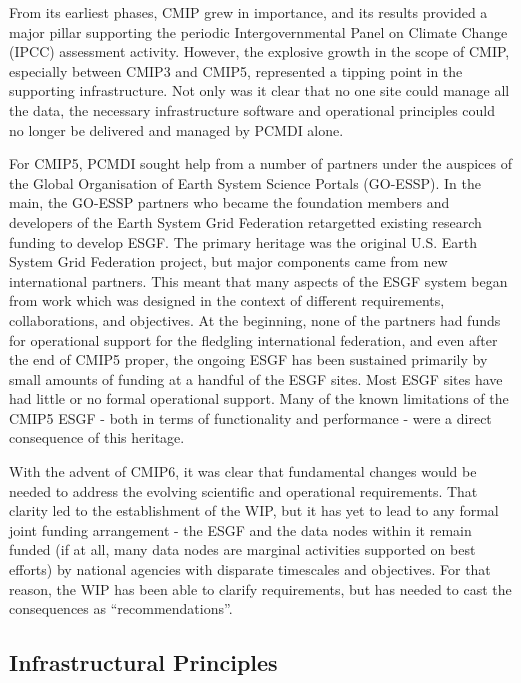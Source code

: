 \documentclass[gmd,manuscript]{copernicus}
\begin{document}
From its earliest phases, CMIP grew in importance, and its results
provided a major pillar supporting the periodic Intergovernmental
Panel on Climate Change (IPCC) assessment activity. However, the
explosive growth in the scope of CMIP, especially between CMIP3 and
CMIP5, represented a tipping point in the supporting infrastructure. Not
only was it clear that no one site could manage all the data, the 
necessary infrastructure software and operational principles could
no longer be delivered and managed by PCMDI alone. 

For CMIP5, PCMDI sought help from a number of partners under the auspices of the Global
Organisation of Earth System Science Portals (GO-ESSP). In the main, the GO-ESSP partners
who became the foundation members and developers of the Earth System
Grid Federation retargetted existing research funding to develop ESGF. The primary
heritage was the original U.S. Earth System Grid Federation project, but major
components came from new international partners. This
meant that many aspects of the ESGF system began from work which was
designed in the context of different requirements, collaborations, and objectives.
At the beginning, none of the partners had funds for operational
support for the fledgling international federation, and even after the end of
CMIP5 proper, the ongoing ESGF has been sustained primarily by small amounts of funding
at a handful of the ESGF sites. Most ESGF sites have had little or no formal
operational support. Many of the known limitations of the CMIP5 ESGF - both in terms of functionality and performance - were a direct consequence of this heritage. 

With the advent of CMIP6, it was clear that fundamental changes would be needed to address 
the evolving scientific and operational requirements. That clarity led to the establishment
of the WIP, but it has yet to lead to any formal joint funding arrangement - the ESGF
and the data nodes within it remain funded (if at all, many data nodes are marginal activities supported on best efforts) by national agencies with disparate timescales
and objectives. For that reason, the WIP has been able to clarify requirements, but has needed to cast the consequences as ``recommendations''. 

\subsection{Infrastructural Principles}
\end{document}
